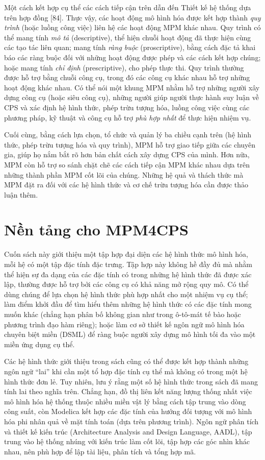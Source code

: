 Một cách kết hợp cụ thể các cách tiếp cận trên dẫn đến Thiết kế hệ thống dựa trên hợp đồng [84]. Thực vậy, các hoạt động mô hình hóa được kết hợp thành \emph{quy trình} (hoặc luồng công việc) liên hệ các hoạt động MPM khác nhau. Quy trình có thể mang tính \emph{mô tả} (descriptive), thể hiện chuỗi hoạt động đã thực hiện cùng các tạo tác liên quan; mang tính \emph{ràng buộc} (proscriptive), bằng cách đặc tả khai báo các ràng buộc đối với những hoạt động được phép và các cách kết hợp chúng; hoặc mang tính \emph{chỉ định} (prescriptive), cho phép thực thi. Quy trình thường được hỗ trợ bằng chuỗi công cụ, trong đó các công cụ khác nhau hỗ trợ những hoạt động khác nhau. Có thể nói một khung MPM nhằm hỗ trợ những người xây dựng công cụ (hoặc siêu công cụ), những người giúp người thực hành suy luận về CPS và xác định hệ hình thức, phép trừu tượng hóa, luồng công việc cùng các phương pháp, kỹ thuật và công cụ hỗ trợ \emph{phù hợp nhất} để thực hiện nhiệm vụ.

Cuối cùng, bằng cách lựa chọn, tổ chức và quản lý ba chiều cạnh trên (hệ hình thức, phép trừu tượng hóa và quy trình), MPM hỗ trợ giao tiếp giữa các chuyên gia, giúp họ nắm bắt rõ hơn bản chất cách xây dựng CPS của mình. Hơn nữa, MPM còn hỗ trợ so sánh chặt chẽ các cách tiếp cận MPM khác nhau dựa trên những thành phần MPM cốt lõi của chúng. Những hệ quả và thách thức mà MPM đặt ra đối với các hệ hình thức và cơ chế trừu tượng hóa cần được thảo luận thêm.

\section{Nền tảng cho MPM4CPS}
Cuốn sách này giới thiệu một tập hợp đại diện các hệ hình thức mô hình hóa, mỗi hệ có một tập đặc tính đặc trưng. Tập hợp này không hề đầy đủ mà nhằm thể hiện sự đa dạng của các đặc tính có trong những hệ hình thức đã được xác lập, thường được hỗ trợ bởi các công cụ có khả năng mở rộng quy mô. Có thể dùng chúng để lựa chọn hệ hình thức phù hợp nhất cho một nhiệm vụ cụ thể; làm điểm khởi đầu để tìm hiểu thêm những hệ hình thức có các đặc tính mong muốn khác (chẳng hạn phân bố không gian như trong ô-tô-mát tế bào hoặc phương trình đạo hàm riêng); hoặc làm cơ sở thiết kế ngôn ngữ mô hình hóa chuyên biệt miền (DSML) để ràng buộc người xây dựng mô hình tối đa vào một miền ứng dụng cụ thể.

Các hệ hình thức giới thiệu trong sách cũng có thể được kết hợp thành những ngôn ngữ ``lai'' khi cần một tổ hợp đặc tính cụ thể mà không có trong một hệ hình thức đơn lẻ. Tuy nhiên, lưu ý rằng một số hệ hình thức trong sách đã mang tính lai theo nghĩa trên. Chẳng hạn, đồ thị liên kết năng lượng thống nhất việc mô hình hóa hệ thống thuộc nhiều miền vật lý bằng cách tập trung vào dòng công suất, còn Modelica kết hợp các đặc tính của hướng đối tượng với mô hình hóa phi nhân quả về mặt tính toán (dựa trên phương trình). Ngôn ngữ phân tích và thiết kế kiến trúc (Architecture Analysis and Design Language, AADL), tập trung vào hệ thống nhúng với kiến trúc làm cốt lõi, tập hợp các góc nhìn khác nhau, nên phù hợp để lập tài liệu, phân tích và tổng hợp mã.

